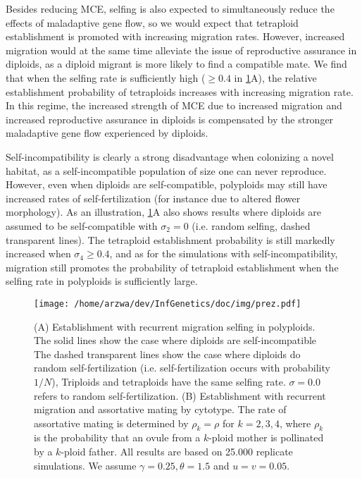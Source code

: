 \documentclass[12pt,a4paper]{article}
\begin{document}
Besides reducing MCE, selfing is also expected to simultaneously reduce the
effects of maladaptive gene flow, so we would expect that tetraploid
establishment is promoted with increasing migration rates. 
However, increased migration would at the same time alleviate the issue of
reproductive assurance in diploids, as a diploid migrant is more likely to find
a compatible mate.
We find that when the selfing rate is sufficiently high ($\ge 0.4$ in
\cref{fig:selfing}A), the relative establishment probability of tetraploids
increases with increasing migration rate.
In this regime, the increased strength of MCE due to increased migration and
increased reproductive assurance in diploids is compensated by the stronger
maladaptive gene flow experienced by diploids.

Self-incompatibility is clearly a strong disadvantage when colonizing a novel
habitat, as a self-incompatible population of size one can never reproduce.
However, even when diploids are self-compatible, polyploids may still have
increased rates of self-fertilization (for instance due to altered flower
morphology). As an illustration, \cref{fig:selfing}A also shows results where
diploids are assumed to be self-compatible with $\sigma_2=0$ (i.e. random
selfing, dashed transparent lines).
The tetraploid establishment probability is still markedly increased when
$\sigma_4 \ge 0.4$, and as for the simulations with self-incompatibility,
migration still promotes the probability of tetraploid establishment when the
selfing rate in polyploids is sufficiently large.

\begin{figure}
\centering
\texttt{[image: /home/arzwa/dev/InfGenetics/doc/img/prez.pdf]} 
    \caption{
    (A) Establishment with recurrent migration selfing in polyploids. 
    The solid lines show the case where diploids are self-incompatible 
    The dashed transparent lines show the case where diploids do random
    self-fertilization (i.e. self-fertilization occurs with probability $1/N$),
    Triploids and tetraploids have the same selfing rate. 
    $\sigma=0.0$ refers to random self-fertilization.  
    (B) Establishment with recurrent migration and assortative mating by
    cytotype. The rate of assortative mating is determined by $\rho_k = \rho$
    for $k=2,3,4$, where $\rho_k$ is the probability that an ovule from a
    $k$-ploid mother is pollinated by a $k$-ploid father.
    All results are based on 25.000 replicate simulations.  We assume
    $\gamma=0.25, \theta=1.5$ and $u=v=0.05$.  \label{fig:selfing}}
\end{figure}
\end{document}
